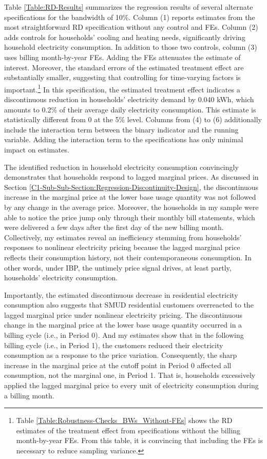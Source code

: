 Table \ref{Table:RD-Results} summarizes the regression results of several alternate specifications for the bandwidth of 10\%. Column (1) reports estimates from the most straightforward RD specification without any control and FEs. Column (2) adds controls for households' cooling and heating needs, significantly driving household electricity consumption. In addition to those two controls, column (3) uses billing month-by-year FEs. Adding the FEs attenuates the estimate of interest. Moreover, the standard errors of the estimated treatment effect are substantially smaller, suggesting that controlling for time-varying factors is important.\footnote{Table \ref{Table:Robustness-Checks_BWs_Without-FEs} shows the RD estimates of the treatment effect from specifications without the billing month-by-year FEs. From this table, it is convincing that including the FEs is necessary to reduce sampling variance.} In this specification, the estimated treatment effect indicates a discontinuous reduction in households' electricity demand by 0.040 kWh, which amounts to 0.2\% of their average daily electricity consumption. This estimate is statistically different from 0 at the 5\% level. Columns from (4) to (6) additionally include the interaction term between the binary indicator and the running variable. Adding the interaction term to the specifications has only minimal impact on estimates. 

The identified reduction in household electricity consumption convincingly demonstrates that households respond to lagged marginal prices. As discussed in Section \ref{C1-Sub-Sub-Section:Regression-Discontinuity-Design}, the discontinuous increase in the marginal price at the lower base usage quantity was not followed by any change in the average price. Moreover, the households in my sample were able to notice the price jump only through their monthly bill statements, which were delivered a few days after the first day of the new billing month. Collectively, my estimates reveal an inefficiency stemming from households' responses to nonlinear electricity pricing because the lagged marginal price reflects their consumption history, not their contemporaneous consumption. In other words, under IBP, the untimely price signal drives, at least partly, households' electricity consumption. 

Importantly, the estimated discontinuous decrease in residential electricity consumption also suggests that SMUD residential customers overreacted to the lagged marginal price under nonlinear electricity pricing. The discontinuous change in the marginal price at the lower base usage quantity occurred in a billing cycle (i.e., in Period 0). And my estimates show that in the following billing cycle (i.e., in Period 1), the customers reduced their electricity consumption as a response to the price variation. Consequently, the sharp increase in the marginal price at the cutoff point in Period 0 affected all consumption, not the marginal one, in Period 1. That is, households excessively applied the lagged marginal price to every unit of electricity consumption during a billing month. 

